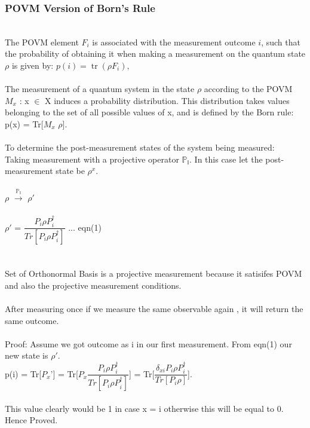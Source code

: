 \documentclass{article}
\begin{document}
\subsubsection{POVM Version of Born's Rule} \\
The POVM element ${\displaystyle F_{i}}$ is associated with the measurement outcome ${\displaystyle i}$, such that the probability of obtaining it when making a measurement on the quantum state ${\displaystyle \rho }$  is given by:
${\displaystyle p(i)=\operatorname {tr} (\rho F_{i}),}$
\\
\\
The measurement of a quantum system in the state $\rho$ according to the POVM
${M_{x}}$ : x $\in$ X induces a probability distribution. This distribution takes values belonging to the set of all possible values of x, and is defined by the Born rule:
p(x) = Tr[${M_{x}}$ $\rho$].
\\
\\ 
To determine the post-measurement states of the system being measured:
\\
Taking measurement with a projective operator $\mathbb{P_{i}}$.
In this case let the post-measurement state be $\rho ^{x}$.
\\
\\
$\rho$ $\xrightarrow{\text{$\mathbb{P_{i}}$}}$ $\rho '$
\\
\\
$\rho '$ = $\dfrac{P_{i} \rho P_{i} ^ \dagger}{Tr[{P_{i} \rho P_{i} ^ \dagger}]}$ ...  eqn(1)
\\
\\
\\
Set of Orthonormal Basis is a projective measurement because it satisifes POVM and also the projective measurement conditions.
\\ 
\\
After measuring once if we measure the same observable again , it will return the same outcome.
\\
\\
Proof:
Assume we got outcome as $\mathrm{i}$ in our first measurement. From eqn(1) our new state is $\rho '$.
\\
p(i) = Tr[$P_{x}$\rho '] = Tr[$P_{x}$$\dfrac{P_{i} \rho P_{i} ^ \dagger}{Tr[{P_{i} \rho P_{i} ^ \dagger}]}$] = Tr[$\dfrac{\delta_{xi} P_{i} \rho P_{i} ^ \dagger}{Tr[{P_{i} \rho }]}$].
\\
\\
This value clearly would be 1 in case x = i otherwise this will be equal to 0.
\\
Hence Proved.
\end{document}
